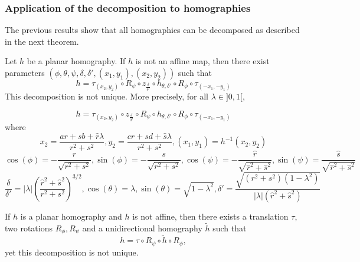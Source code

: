 \subsubsection{Application of the decomposition to homographies}
The previous results show that all homographies can be decomposed as described in the next theorem.

\begin{thm}
Let $h$ be a planar homography. If $h$ is not an affine map, then there exist parameters $(\phi,\theta,\psi,\delta,\delta',(x_1,y_1),(x_2,y_2))$ such that
\begin{equation*}
h = \tau_{(x_2,y_2)} \circ R_{\psi} \circ z_{\frac{\delta}{\delta'}} \circ h_{\theta,\delta'} \circ R_{\phi} \circ \tau_{(-x_1,-y_1)}
\end{equation*}
This decomposition is not unique. More precisely, for all $\lambda \in ]0,1[$,

  \begin{equation*}
h = \tau_{(x_2,y_2)} \circ z_{\frac{\delta}{\delta'}}  \circ R_{\psi} \circ h_{\theta,\delta'} \circ R_{\phi} \circ \tau_{(-x_1,-y_1)}
  \end{equation*}
  where 
 \begin{equation*}
x_2=\frac{ar+sb+\hat r \lambda}{r^2 +s^2}, y_2=\frac{cr+sd+\hat s \lambda}{r^2 +s^2}, (x_1 , y_1) = h^{-1}(x_{2},y_{2})
  \end{equation*}
 \begin{equation*}
 \cos( \phi )= - \frac{r}{\sqrt{r^2 + s^2}}, \sin( \phi )= - \frac{s}{\sqrt{r^2 + s^2}},\cos( \psi ) =- \frac{\hat r}{\sqrt{\hat r^2 + \hat s^2}}, \sin( \psi ) = \frac{\hat s}{\sqrt{\hat r^2 + \hat s^2}}
 \end{equation*}
 \begin{equation*}
 \frac{\delta}{\delta'}=|\lambda|\left(\frac{\hat r^2 + \hat s^2}{r^2 + s^2}\right)^{3/2}, \cos(\theta)=\lambda, \sin(\theta)=\sqrt{1-\lambda^2}, \delta'=  \frac{\sqrt{(r^2 + s^2)(1-\lambda^2)}}{|\lambda| (\hat r^2+\hat s^2)}
 \end{equation*}
\label{thepropdecomp}
\end{thm}

\begin{corollaire} If $h$ is a planar homography and $h$ is not affine, then there exists a translation $\tau$, two rotations $R_\phi ,R_\psi$ and a unidirectional homography $\tilde{h}$ such that
\begin{equation}
h=\tau \circ R_\psi \circ \tilde{h} \circ R_\phi,
\label{formule_decomposition_effective}
\end{equation}
yet this decomposition is not unique.
\label{thecorollairedecomp}
\end{corollaire}

